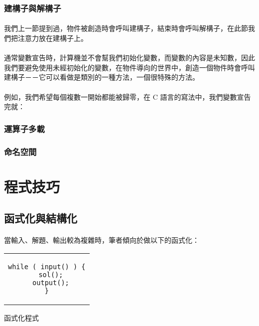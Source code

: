 \documentclass[12pt,a4paper,oneside]{report}
\begin{document}
\begin{CJK}{UTF8}{bkai}
\subsubsection{建構子與解構子}

\paragraph{}我們上一節提到過，物件被創造時會呼叫建構子，結束時會呼叫解構子，在此節我們把注意力放在建構子上。
\paragraph{}通常變數宣告時，計算機並不會幫我們初始化變數，而變數的內容是未知數，因此我們要避免使用未經初始化的變數，在物件導向的世界中，創造一個物件時會呼叫建構子－－它可以看做是類別的一種方法，一個很特殊的方法。
\paragraph{}例如，我們希望每個複數一開始都能被歸零，在 C 語言的寫法中，我們變數宣告完就：

\subsubsection{運算子多載}

\subsubsection{命名空間}

\section{程式技巧}

\subsection{函式化與結構化}

\paragraph{}當輸入、解題、輸出較為複雜時，筆者傾向於做以下的函式化：

\begin{code}[h!]
\centering
\begin{tabular}{c}
\begin{lstlisting}
while ( input() ) {
  sol();
  output();
}
\end{lstlisting}
\end{tabular}
\caption{函式化程式}
\label{program:struct:code:input:function}
\end{code}


\end{CJK}
\end{document}
